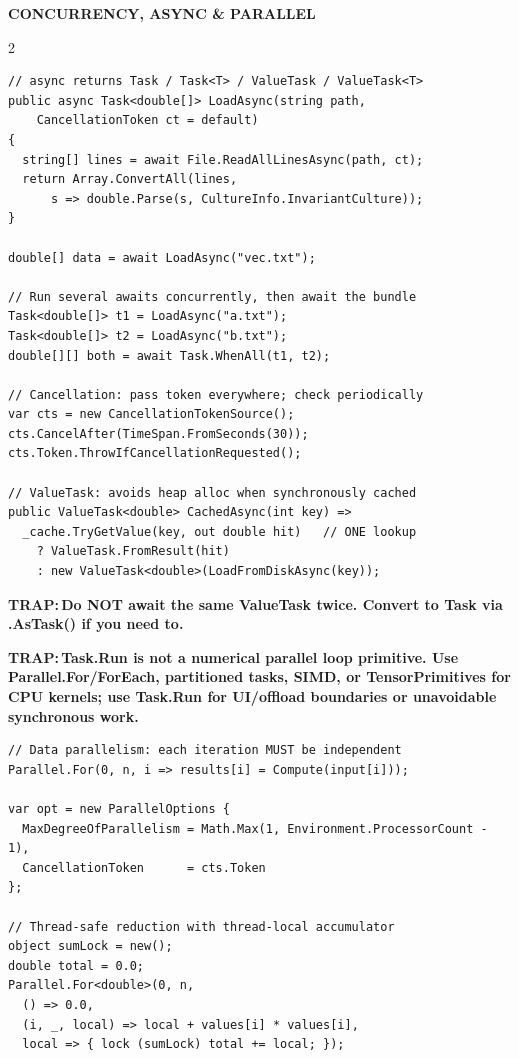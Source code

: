 \documentclass[9pt,a4paper]{extarticle}
\newenvironment{card}[3][acBlue]{%
  \begin{tcolorbox}[
    enhanced, colback=#2, colframe=bdCard,
    coltitle=black, colbacktitle=#2!70!bgHdr,
    fonttitle=\bfseries\fontsize{6.16pt}{7.48pt}\selectfont\MakeUppercase,
    title={#3},
    left=3pt, right=2pt, top=1.4pt, bottom=1.8pt,
    toptitle=1pt, bottomtitle=1pt,
    boxrule=0.4pt,
    borderline west={3pt}{0pt}{#1},
    arc=2pt, before skip=0pt, after skip=1.6mm,
    breakable, toprule at break=0pt, bottomrule at break=0pt,
  ]}{\end{tcolorbox}}
\newcommand{\sectionbanner}[1]{%
  \vspace{0.4mm}%
  {\setlength{\fboxsep}{1.5pt}%
   \colorbox{secBg}{\color{white}\bfseries\fontsize{6.6pt}{7.9pt}\selectfont
   \MakeUppercase{\hspace{0.5mm}#1\hspace{0.5mm}}}%
  }\vspace{1.3mm}\par\nobreak}
\newcommand{\code}[1]{{\ttfamily\bfseries #1}}
\newcommand{\trap}[1]{\par\noindent
  \begin{minipage}{\linewidth}%
  {\fontsize{5.6pt}{6.8pt}\selectfont\color{trap}\bfseries TRAP:\,#1}%
  \end{minipage}\par}
\begin{document}
\sectionbanner{Concurrency, Async \& Parallel}
\begin{multicols}{2}

\begin{card}[acAmber]{bgAmber}{async / await, Task \& ValueTask}
\begin{lstlisting}[style=cs]
// async returns Task / Task<T> / ValueTask / ValueTask<T>
public async Task<double[]> LoadAsync(string path,
    CancellationToken ct = default)
{
  string[] lines = await File.ReadAllLinesAsync(path, ct);
  return Array.ConvertAll(lines,
      s => double.Parse(s, CultureInfo.InvariantCulture));
}

double[] data = await LoadAsync("vec.txt");

// Run several awaits concurrently, then await the bundle
Task<double[]> t1 = LoadAsync("a.txt");
Task<double[]> t2 = LoadAsync("b.txt");
double[][] both = await Task.WhenAll(t1, t2);

// Cancellation: pass token everywhere; check periodically
var cts = new CancellationTokenSource();
cts.CancelAfter(TimeSpan.FromSeconds(30));
cts.Token.ThrowIfCancellationRequested();

// ValueTask: avoids heap alloc when synchronously cached
public ValueTask<double> CachedAsync(int key) =>
  _cache.TryGetValue(key, out double hit)   // ONE lookup
    ? ValueTask.FromResult(hit)
    : new ValueTask<double>(LoadFromDiskAsync(key));
\end{lstlisting}
\trap{Do NOT \code{await} the same \code{ValueTask} twice. Convert
to \code{Task} via \code{.AsTask()} if you need to.}
\trap{\code{Task.Run} is not a numerical parallel loop primitive. Use
\code{Parallel.For/ForEach}, partitioned tasks, SIMD, or \code{TensorPrimitives}
for CPU kernels; use \code{Task.Run} for UI/offload boundaries or unavoidable
synchronous work.}
\end{card}

\begin{card}[acNavy]{bgNavy}{Parallel \& Thread Safety}
\begin{lstlisting}[style=cs]
// Data parallelism: each iteration MUST be independent
Parallel.For(0, n, i => results[i] = Compute(input[i]));

var opt = new ParallelOptions {
  MaxDegreeOfParallelism = Math.Max(1, Environment.ProcessorCount - 1),
  CancellationToken      = cts.Token
};

// Thread-safe reduction with thread-local accumulator
object sumLock = new();
double total = 0.0;
Parallel.For<double>(0, n,
  () => 0.0,
  (i, _, local) => local + values[i] * values[i],
  local => { lock (sumLock) total += local; });


\end{lstlisting}
\end{card}
\end{multicols}
\end{document}
